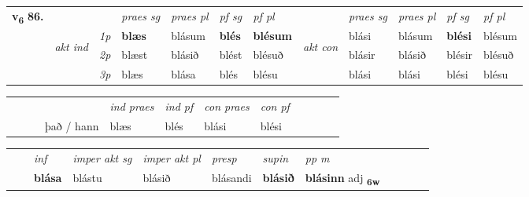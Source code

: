 \begin{tabular}{llllllllllll} \toprule
\multirow{4}{*}{{{\textbf{v{\textsubscript{6}}} \Large{\textbf{86.}}}}}  & &   &  \textit{praes sg}  & \textit{praes pl}  &\textit{ pf sg} & \textit{pf pl} &  &  \textit{praes sg}  & \textit{praes pl}  & \textit{pf sg} & \textit{pf pl } \\*
	\cmidrule{4-7} \cmidrule{9-12}
 & \multirow{3}{*}{\begin{turn}{90}\textit{akt ind}\end{turn}} & {\textit{1p}} & \textbf{blæs} & blásum    & \textbf{blés} & \textbf{blésum} & \multirow{3}{*}{\begin{turn}{90}\textit{akt con}\end{turn}} &blási & blásum & \textbf{blési} & blésum\\*
& &  {\textit{2p}} &  blæst  & blásið   & blést & blésuð & & blásir & blásið & blésir & blésuð \\*
& &  {\textit{3p}} & blæs & blása   & blés & blésu & & blási & blási& blési & blésu  \\*
\cmidrule{4-7} \cmidrule{9-12}
\end{tabular}


\begin{tabular}{llllllllllll}
 & &  & &  \textit{ind praes} & \textit{ind pf} & \textit{con praes} & \textit{con pf} \\*
&  & & það / hann & blæs & blés & blási & blési \\*
\cmidrule{5-9}
\end{tabular}


\begin{tabular}{llllllllllll}
 & & \textit{inf} & \textit{imper akt sg} & \textit{imper akt pl}   & \textit{presp} & \textit{supin}  & \textit{pp m}     \\*
  & & \textbf{blása} & blástu  & blásið   & blásandi &  \textbf{blásið}  & \textbf{blásinn} adj \textbf{\textsubscript{6w}} \\*
\cmidrule{1-12}
\end{tabular}



